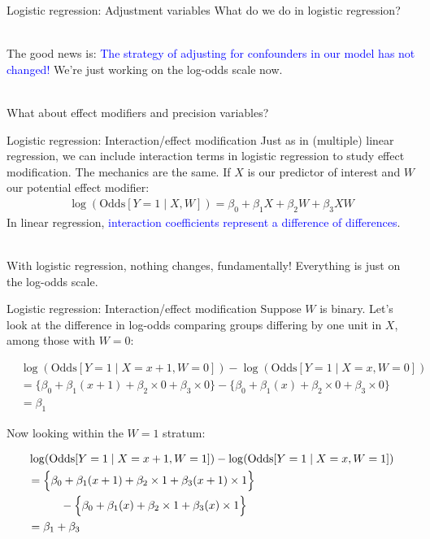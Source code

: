 \documentclass[10pt,t]{beamer}
\newcommand\tab[1][1cm]{\hspace*{#1}}
\begin{document}
\begin{frame}{Logistic regression: Adjustment variables}
	What do we do in logistic regression?
	\\ ~\ 
	
	The good news is: \textcolor{blue}{The strategy of adjusting for confounders in our model has not changed!} We're just working on the log-odds scale now. 
	\\ ~\ 
	
	What about effect modifiers and precision variables?
\end{frame}

\begin{frame}{Logistic regression: Interaction/effect modification}
	Just as in (multiple) linear regression, we can include interaction terms in logistic regression to study effect modification. The mechanics are the same. If $X$ is our predictor of interest and $W$ our potential effect modifier: 
	\begin{align*}
	\log(\text{Odds}[Y = 1 \mid X, W]) = \beta_0 + \beta_1X + \beta_2W + \beta_3XW
	\end{align*} 
	In linear regression, \textcolor{blue}{interaction coefficients represent a difference of differences}. 
	\\ ~\ 
	
	With logistic regression, nothing changes, fundamentally! Everything is just on the log-odds scale. 
\end{frame}

\begin{frame}{Logistic regression: Interaction/effect modification}
	Suppose $W$ is binary. Let's look at the difference in log-odds comparing groups differing by one unit in $X$, among those with $W = 0$:
	\begin{small}
		\begin{align*}
		&\log(\text{Odds}[Y = 1 \mid X = x+1, W = 0]) - \log(\text{Odds}[Y = 1 \mid X = x, W = 0])\\
		&= \Big\{\beta_0 + \beta_1(x + 1) + \beta_2\times 0 + \beta_3 \times 0 \Big\}- \Big\{\beta_0 + \beta_1(x) + \beta_2\times 0 + \beta_3 \times 0\Big\}\\
		&= \beta_1 
		\end{align*}
	\end{small} 
	Now looking within the $W = 1$ stratum:
	\begin{small}
		\begin{align*}
		&\log(\text{Odds}[Y = 1 \mid X = x+1, W = 1]) - \log(\text{Odds}[Y = 1 \mid X = x, W = 1])\\
		&= \Big\{\beta_0 + \beta_1(x + 1) + \beta_2\times 1 + \beta_3(x+1) \times 1 \Big\}\\
		&\tab - \Big\{\beta_0 + \beta_1(x) + \beta_2\times 1 + \beta_3 (x)\times 1\Big\}\\
		&= \beta_1 + \beta_3
		\end{align*}
	\end{small}
\end{frame}
\end{document}
